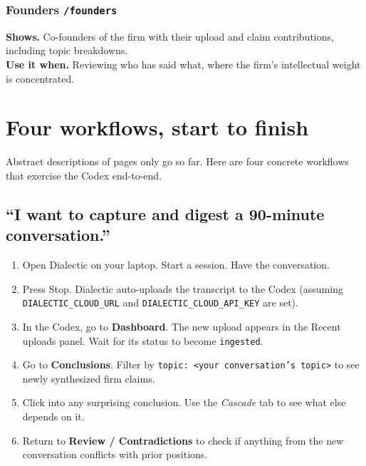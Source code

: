 \documentclass[11pt,letterpaper]{article}
\newcommand{\file}[1]{\texttt{#1}}
\newcommand{\page}[1]{\textbf{#1}}
\newcommand{\tab}[1]{\textsl{#1}}
\begin{document}
\subsubsection*{Founders \hfill \file{/founders}}
\textbf{Shows.} Co-founders of the firm with their upload and claim contributions, including topic breakdowns. \\
\textbf{Use it when.} Reviewing who has said what, where the firm's intellectual weight is concentrated.

\section{Four workflows, start to finish}

Abstract descriptions of pages only go so far. Here are four concrete workflows that exercise the Codex end-to-end.

\subsection{``I want to capture and digest a 90-minute conversation.''}
\begin{enumerate}[leftmargin=*,itemsep=0.2em]
  \item Open Dialectic on your laptop. Start a session. Have the conversation.
  \item Press Stop. Dialectic auto-uploads the transcript to the Codex (assuming \file{DIALECTIC\_CLOUD\_URL} and \file{DIALECTIC\_CLOUD\_API\_KEY} are set).
  \item In the Codex, go to \page{Dashboard}. The new upload appears in the Recent uploads panel. Wait for its status to become \texttt{ingested}.
  \item Go to \page{Conclusions}. Filter by \texttt{topic: <your conversation's topic>} to see newly synthesized firm claims.
  \item Click into any surprising conclusion. Use the \tab{Cascade} tab to see what else depends on it.
  \item Return to \page{Review / Contradictions} to check if anything from the new conversation conflicts with prior positions.
\end{enumerate}
\end{document}
